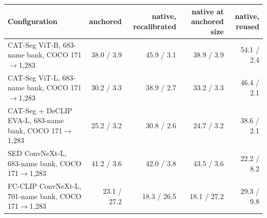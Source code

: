 \begin{tabular}{@{}lrrrr@{}}
\toprule
Configuration & anchored & native, recalibrated & native at anchored size & native, reused \\
\midrule
CAT-Seg ViT-B, 683-name bank, COCO 171$\to$1,283 & 38.0 / 3.9 & 45.9 / 3.1 & 38.9 / 3.9 & 54.1 / 2.4 \\
CAT-Seg ViT-L, 683-name bank, COCO 171$\to$1,283 & 30.2 / 3.3 & 38.9 / 2.7 & 33.2 / 3.3 & 46.4 / 2.1 \\
CAT-Seg + DeCLIP EVA-L, 683-name bank, COCO 171$\to$1,283 & 25.2 / 3.2 & 30.8 / 2.6 & 24.7 / 3.2 & 38.6 / 2.1 \\
SED ConvNeXt-L, 683-name bank, COCO 171$\to$1,283 & 41.2 / 3.6 & 42.0 / 3.8 & 43.5 / 3.6 & 22.2 / 8.2 \\
FC-CLIP ConvNeXt-L, 701-name bank, COCO 171$\to$1,283 & 23.1 / 27.2 & 18.3 / 26.5 & 18.1 / 27.2 & 29.3 / 9.8 \\
\bottomrule
\end{tabular}
